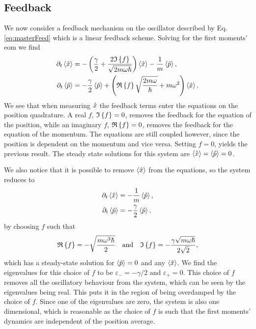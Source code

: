 \subsection{Feedback}
We now consider a feedback mechanism on the oscillator described by Eq. \eqref{eq:masterFeed} which is a linear feedback scheme. Solving for the first moments' \gls{eom} we find 
\begin{align}
    \partial_t\expval{\hat{x}} &= - \left(\frac{\gamma}{2} + \frac{2 \mathfrak{I}\left\{f\right\}}{\sqrt{2 m \omega \hbar}} \right)\expval{\hat{x}} - \frac{1}{m} \expval{\hat{p}},\\
    \partial_t\expval{\hat{p}} &= -\frac{\gamma}{2}\expval{\hat{p}} + \left(\mathfrak{R}\left\{f\right\} \sqrt{\frac{2 m \omega}{\hbar}} + m \omega^2 \right) \expval{\hat{x}}.
\end{align}
We see that when measuring $\hat{x}$ the feedback terms enter the equations on the position quadrature. A real $f$, $\mathfrak{I}\left\{f\right\} = 0$, removes the feedback for the equation of the position, while an imaginary $f$, $\mathfrak{R}\left\{f\right\} = 0$, removes the feedback for the equation of the momentum. The equations are still coupled however, since the position is dependent on the momentum and vice versa. Setting $f = 0$, yields the previous result. The steady state solutions for this system are $\expval{\hat{x}} = \expval{\hat{p}} = 0$.

We also notice that it is possible to remove $\expval{\hat{x}}$ from the equations, so the system reduces to 
\begin{align}
    \partial_t\expval{\hat{x}} &= - \frac{1}{m} \expval{\hat{p}},\\
    \partial_t\expval{\hat{p}} &= -\frac{\gamma}{2} \expval{\hat{p}},
\end{align}
by choosing $f$ such that
\begin{equation}
    \mathfrak{R}\left\{f\right\} = - \sqrt{\frac{m \omega^3 \hbar}{2}} \quad \text{and} \quad \mathfrak{I}\left\{f\right\} = -\frac{\gamma\sqrt{m\omega\hbar}}{2\sqrt{2}} \label{eq:reFimF_toZero},
\end{equation}
which has a steady-state solution for $\expval{\hat{p}} = 0$ and any $\expval{\hat{x}}$. We find the eigenvalues for this choice of $f$ to be $\varepsilon_- = -\gamma /2$ and $\varepsilon_+ = 0$. This choice of $f$ removes all the oscillatory behaviour from the system, which can be seen by the eigenvalues being real. This puts it in the region of being overdamped by the choice of $f$. Since one of the eigenvalues are zero, the system is also  one dimensional, which is reasonable as the choice of $f$ is such that the first moments' dynamics are independent of the position average.

